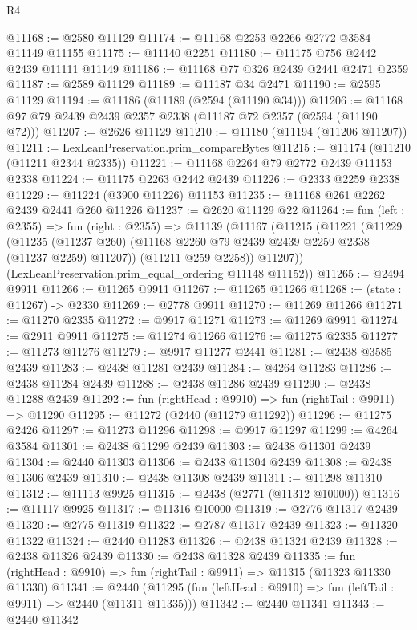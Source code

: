 \begin{lexlean}{R4}
\begin{coremodule}
@11168 := @2580 @11129
@11174 := @11168 @2253 @2266 @2772 @3584 @11149 @11155
@11175 := @11140 @2251
@11180 := @11175 @756 @2442 @2439 @11111 @11149
@11186 := @11168 @77 @326 @2439 @2441 @2471 @2359
@11187 := @2589 @11129
@11189 := @11187 @34 @2471
@11190 := @2595 @11129
@11194 := @11186 (@11189 (@2594 (@11190 @34)))
@11206 := @11168 @97 @79 @2439 @2439 @2357 @2338 (@11187 @72 @2357 (@2594 (@11190 @72)))
@11207 := @2626 @11129
@11210 := @11180 (@11194 (@11206 @11207))
@11211 := LexLeanPreservation.prim_compareBytes
@11215 := @11174 (@11210 (@11211 @2344 @2335))
@11221 := @11168 @2264 @79 @2772 @2439 @11153 @2338
@11224 := @11175 @2263 @2442 @2439
@11226 := @2333 @2259 @2338
@11229 := @11224 (@3900 @11226) @11153
@11235 := @11168 @261 @2262 @2439 @2441 @260 @11226
@11237 := @2620 @11129 @22
@11264 := fun (left : @2355) =>
  fun (right : @2355) =>
  @11139
    (@11167
      (@11215
        (@11221
          (@11229
            (@11235 (@11237 @260) (@11168 @2260 @79 @2439 @2439 @2259 @2338 (@11237 @2259) @11207))
            (@11211 @259 @2258))
          @11207))
      (LexLeanPreservation.prim_equal_ordering @11148 @11152))
@11265 := @2494 @9911
@11266 := @11265 @9911
@11267 := @11265 @11266
@11268 := (state : @11267) -> @2330
@11269 := @2778 @9911
@11270 := @11269 @11266
@11271 := @11270 @2335
@11272 := @9917 @11271
@11273 := @11269 @9911
@11274 := @2911 @9911
@11275 := @11274 @11266
@11276 := @11275 @2335
@11277 := @11273 @11276
@11279 := @9917 @11277 @2441
@11281 := @2438 @3585 @2439
@11283 := @2438 @11281 @2439
@11284 := @4264 @11283
@11286 := @2438 @11284 @2439
@11288 := @2438 @11286 @2439
@11290 := @2438 @11288 @2439
@11292 := fun (rightHead : @9910) => fun (rightTail : @9911) => @11290
@11295 := @11272 (@2440 (@11279 @11292))
@11296 := @11275 @2426
@11297 := @11273 @11296
@11298 := @9917 @11297
@11299 := @4264 @3584
@11301 := @2438 @11299 @2439
@11303 := @2438 @11301 @2439
@11304 := @2440 @11303
@11306 := @2438 @11304 @2439
@11308 := @2438 @11306 @2439
@11310 := @2438 @11308 @2439
@11311 := @11298 @11310
@11312 := @11113 @9925
@11315 := @2438 (@2771 (@11312 @10000))
@11316 := @11117 @9925
@11317 := @11316 @10000
@11319 := @2776 @11317 @2439
@11320 := @2775 @11319
@11322 := @2787 @11317 @2439
@11323 := @11320 @11322
@11324 := @2440 @11283
@11326 := @2438 @11324 @2439
@11328 := @2438 @11326 @2439
@11330 := @2438 @11328 @2439
@11335 := fun (rightHead : @9910) => fun (rightTail : @9911) => @11315 (@11323 @11330 @11330)
@11341 := @2440 (@11295 (fun (leftHead : @9910) => fun (leftTail : @9911) => @2440 (@11311 @11335)))
@11342 := @2440 @11341
@11343 := @2440 @11342

\end{coremodule}
\end{lexlean}
